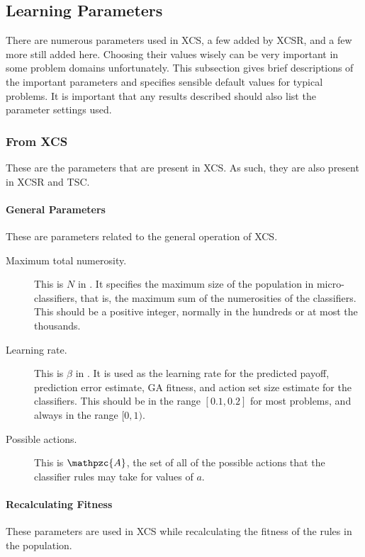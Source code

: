 \subsection{Learning Parameters}
\label{sec:parameters}
There are numerous parameters used in XCS, a few added by XCSR, and a few more still added here.
Choosing their values wisely can be very important in some problem domains unfortunately.
This subsection gives brief descriptions of the important parameters and specifies sensible default values for typical problems.
It is important that any results described should also list the parameter settings used.

\subsubsection{From XCS}
These are the parameters that are present in XCS.
As such, they are also present in XCSR and TSC.

\paragraph{General Parameters}
These are parameters related to the general operation of XCS.

\begin{description}
\item [Maximum total numerosity.]
This is $N$ in \cite{ButzWilson}.
It specifies the maximum size of the population in micro-classifiers,
that is, the maximum sum of the numerosities of the classifiers.
This should be a positive integer, normally in the hundreds or at most the thousands.
\item [Learning rate.]
This is $\beta$ in \cite{ButzWilson}.
It is used as the learning rate for the predicted payoff,
prediction error estimate, GA fitness, and action set size estimate
for the classifiers.
This should be in the range $[0.1, 0.2]$ for most problems, and always in the range $[0, 1)$.
\item [Possible actions.]
This is $\mathpzc{A}$, the set of all of the possible actions that the classifier rules may take for values of $a$.
\end{description}

\paragraph{Recalculating Fitness}
These parameters are used in XCS while recalculating the fitness of the rules in the population.

